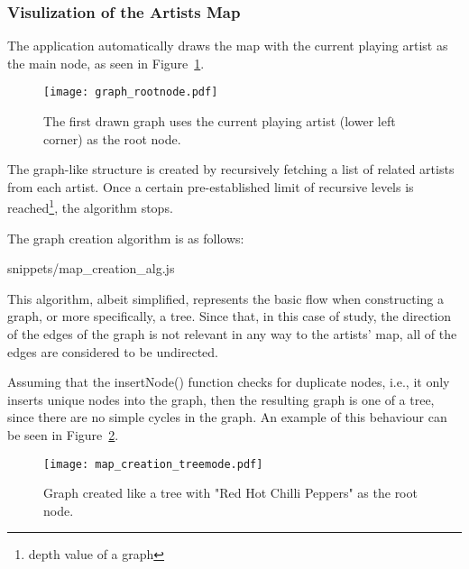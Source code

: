     \subsubsection{Visulization of the Artists Map} %
      \label{ssub:visualization}
    
      The application automatically draws the map with the current playing artist as the main node, as seen in Figure~\ref{fig:graph_rootnode}.

      \begin{figure}[tb]
        \begin{center}
          \texttt{[image: graph\_rootnode.pdf]}
        \end{center}
        \caption{The first drawn graph uses the current playing artist (lower left corner) as the root node.}
        \label{fig:graph_rootnode}
      \end{figure}

      The graph-like structure is created by recursively fetching a list of related artists from each artist. Once a certain pre-established limit of recursive levels is reached\footnote{depth value of a graph}, the algorithm stops.

      The graph creation algorithm is as follows:

      
      {snippets/map_creation_alg.js}

      This algorithm, albeit simplified, represents the basic flow when constructing a graph, or more specifically, a tree.
      Since that, in this case of study, the direction of the edges of the graph is not relevant in any way to the artists' map, all of the edges are considered to be undirected.

      Assuming that the insertNode() function checks for duplicate nodes, i.e., it only inserts unique nodes into the graph, then the resulting graph is one of a tree, since there are no simple cycles in the graph.
      An example of this behaviour can be seen in Figure~\ref{fig:graph_treemode}.

      \begin{figure}[tb]
        \begin{center}
          \texttt{[image: map\_creation\_treemode.pdf]}
        \end{center}
        \caption{Graph created like a tree with "Red Hot Chilli Peppers" as the root node.}
        \label{fig:graph_treemode}
      \end{figure}

